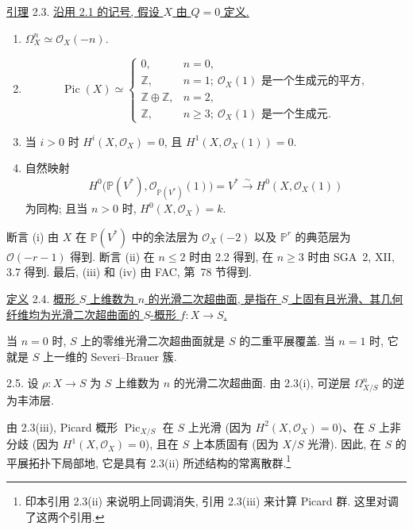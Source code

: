 
\underline{引理} 2.3. \underline{沿用 2.1 的记号, 假设 $X$ 由 $Q=0$ 定义.}

\begin{enumerate}[label=(\roman*),leftmargin=2.6em]
\item $\Omega_X^n\simeq\mathcal O_X(-n)$.

\item
\begin{equation*}
\operatorname{Pic}(X)\simeq
\begin{cases}
0, & n=0,\\
\mathbb Z, & n=1;\ \mathcal O_X(1)\text{ 是一个生成元的平方},\\
\mathbb Z\oplus\mathbb Z, & n=2,\\
\mathbb Z, & n\geq 3;\ \mathcal O_X(1)\text{ 是一个生成元}.
\end{cases}
\end{equation*}

\item 当 $i>0$ 时 $H^i(X,\mathcal O_X)=0$, 且 $H^1(X,\mathcal O_X(1))=0$.

\item 自然映射
\begin{equation*}
H^0\bigl(\mathbb P(V^*),\mathcal O_{\mathbb P(V^*)}(1)\bigr)
=V^*\xrightarrow{\sim}H^0(X,\mathcal O_X(1))
\end{equation*}
为同构; 且当 $n>0$ 时,
$H^0(X,\mathcal O_X)=k$.
\end{enumerate}

断言 (i) 由 $X$ 在 $\mathbb P(V^*)$ 中的余法层为 $\mathcal O_X(-2)$ 以及 $\mathbb P^r$ 的典范层为 $\mathcal O(-r-1)$ 得到. 断言 (ii) 在 $n\leq 2$ 时由 2.2 得到, 在 $n\geq 3$ 时由 SGA~2, XII, 3.7 得到. 最后, (iii) 和 (iv) 由 FAC, 第~78 节得到.

\underline{定义} 2.4. \underline{概形 $S$ 上维数为 $n$ 的光滑二次超曲面, 是指在 $S$ 上固有且光滑、其几何纤维均为光滑二次超曲面的 $S$-概形 $f:X\longrightarrow S$.}

当 $n=0$ 时, $S$ 上的零维光滑二次超曲面就是 $S$ 的二重平展覆盖. 当 $n=1$ 时, 它就是 $S$ 上一维的 Severi--Brauer 簇.

2.5. 设 $\rho:X\longrightarrow S$ 为 $S$ 上维数为 $n$ 的光滑二次超曲面. 由 2.3(i), 可逆层 $\Omega^n_{X/S}$ 的逆为丰沛层.


由 2.3(iii), Picard 概形 $\operatorname{Pic}_{X/S}$ 在 $S$ 上光滑 (因为 $H^2(X,\mathcal O_X)=0$)、在 $S$ 上非分歧 (因为 $H^1(X,\mathcal O_X)=0$), 且在 $S$ 上本质固有 (因为 $X/S$ 光滑). 因此, 在 $S$ 的平展拓扑下局部地, 它是具有 2.3(ii) 所述结构的常离散群.\footnote{印本引用 2.3(ii) 来说明上同调消失, 引用 2.3(iii) 来计算 Picard 群. 这里对调了这两个引用.}

